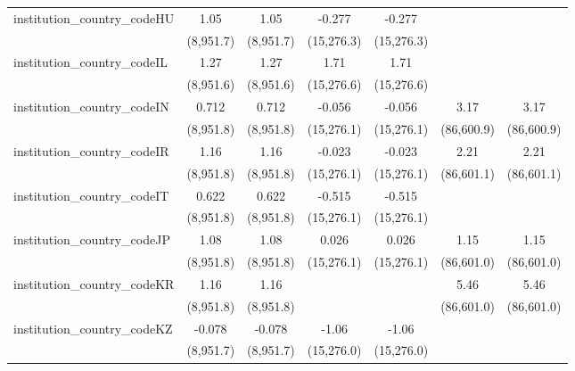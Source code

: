 \begin{tabular}{lcccccc}
   institution\_country\_codeHU          & 1.05          & 1.05          & -0.277        & -0.277        &              &   \\   
                                         & (8,951.7)     & (8,951.7)     & (15,276.3)    & (15,276.3)    &              &   \\   
   institution\_country\_codeIL          & 1.27          & 1.27          & 1.71          & 1.71          &              &   \\   
                                         & (8,951.6)     & (8,951.6)     & (15,276.6)    & (15,276.6)    &              &   \\   
   institution\_country\_codeIN          & 0.712         & 0.712         & -0.056        & -0.056        & 3.17         & 3.17\\   
                                         & (8,951.8)     & (8,951.8)     & (15,276.1)    & (15,276.1)    & (86,600.9)   & (86,600.9)\\   
   institution\_country\_codeIR          & 1.16          & 1.16          & -0.023        & -0.023        & 2.21         & 2.21\\   
                                         & (8,951.8)     & (8,951.8)     & (15,276.1)    & (15,276.1)    & (86,601.1)   & (86,601.1)\\   
   institution\_country\_codeIT          & 0.622         & 0.622         & -0.515        & -0.515        &              &   \\   
                                         & (8,951.8)     & (8,951.8)     & (15,276.1)    & (15,276.1)    &              &   \\   
   institution\_country\_codeJP          & 1.08          & 1.08          & 0.026         & 0.026         & 1.15         & 1.15\\   
                                         & (8,951.8)     & (8,951.8)     & (15,276.1)    & (15,276.1)    & (86,601.0)   & (86,601.0)\\   
   institution\_country\_codeKR          & 1.16          & 1.16          &               &               & 5.46         & 5.46\\   
                                         & (8,951.8)     & (8,951.8)     &               &               & (86,601.0)   & (86,601.0)\\   
   institution\_country\_codeKZ          & -0.078        & -0.078        & -1.06         & -1.06         &              &   \\   
                                         & (8,951.7)     & (8,951.7)     & (15,276.0)    & (15,276.0)    &              &   \\   

\end{tabular}
